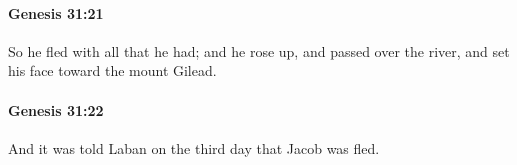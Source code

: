 		\paragraph{Genesis 31:21} %
			\label{GENESIS-31-21}

			So he fled with all that he had; and he rose up, and passed over the river, and set his face toward the mount Gilead.


		\paragraph{Genesis 31:22} %
			\label{GENESIS-31-22}

			And it was told Laban on the third day that Jacob was fled.


